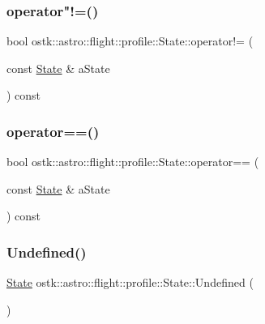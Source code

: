 \subsubsection{\texorpdfstring{operator"!=()}{operator!=()}}
{\footnotesize\ttfamily bool ostk\+::astro\+::flight\+::profile\+::\+State\+::operator!= (\begin{DoxyParamCaption}\item[{const \hyperlink{classostk_1_1astro_1_1flight_1_1profile_1_1_state}{State} \&}]{a\+State }\end{DoxyParamCaption}) const}

\mbox{\label{classostk_1_1astro_1_1flight_1_1profile_1_1_state_a4f6023c3c1d9590ec701bf10b0724ebf}} 
\subsubsection{\texorpdfstring{operator==()}{operator==()}}
{\footnotesize\ttfamily bool ostk\+::astro\+::flight\+::profile\+::\+State\+::operator== (\begin{DoxyParamCaption}\item[{const \hyperlink{classostk_1_1astro_1_1flight_1_1profile_1_1_state}{State} \&}]{a\+State }\end{DoxyParamCaption}) const}

\mbox{\label{classostk_1_1astro_1_1flight_1_1profile_1_1_state_af18b40557aa14bfd0b46d14ad04d33fc}} 
\subsubsection{\texorpdfstring{Undefined()}{Undefined()}}
{\footnotesize\ttfamily \hyperlink{classostk_1_1astro_1_1flight_1_1profile_1_1_state}{State} ostk\+::astro\+::flight\+::profile\+::\+State\+::\+Undefined (\begin{DoxyParamCaption}{ }\end{DoxyParamCaption})\hspace{0.3cm}{\ttfamily [static]}}




